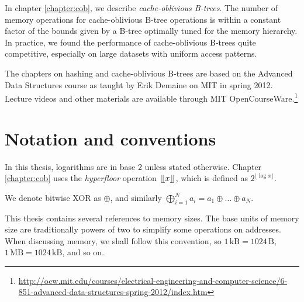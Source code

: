 In chapter \ref{chapter:cob}, we describe \emph{cache-oblivious B-trees}.
The number of memory operations for cache-oblivious B-tree operations
is within a constant factor of the bounds given by a B-tree optimally tuned
for the memory hierarchy. In practice, we found the performance of
cache-oblivious B-trees quite competitive, especially on large datasets
with uniform access patterns.

The chapters on hashing and cache-oblivious B-trees are based on the Advanced
Data Structures course as taught by Erik Demaine on MIT in spring 2012.
Lecture videos and other materials are available through MIT OpenCourseWare.\footnote{%
\url{http://ocw.mit.edu/courses/electrical-engineering-and-computer-science/6-851-advanced-data-structures-spring-2012/index.htm}}

\section*{Notation and conventions}
In this thesis, logarithms are in base 2 unless stated otherwise.
Chapter \ref{chapter:cob} uses the \emph{hyperfloor} operation
$\lfloor \kern -0.22em \lfloor x\rfloor \kern -0.22em \rfloor$, which is defined as $2^{\lfloor\log x\rfloor}$.

We denote bitwise XOR as $\oplus$, and similarly $\bigoplus_{i=1}^N
a_i=a_1\oplus\ldots\oplus a_N$.

This thesis contains several references to memory sizes. The base units of
memory size are traditionally powers of two to simplify some operations on
addresses.
When discussing memory, we shall follow this convention, so
$1\,\mathrm{kB}=1024\,\mathrm{B}$, $1\,\mathrm{MB}=1024\,\mathrm{kB}$,
and so on.

